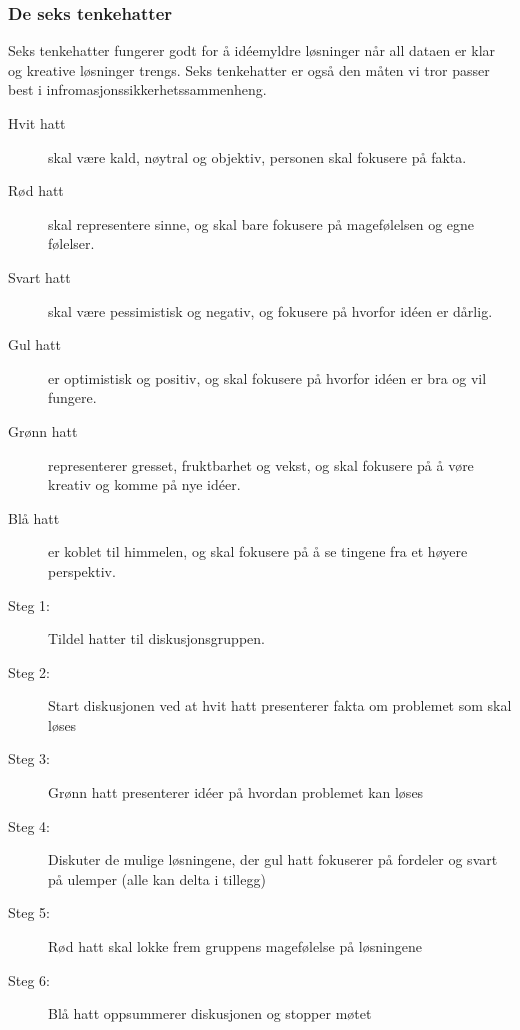 \subsubsection{De seks tenkehatter} 
Seks tenkehatter fungerer godt for å idéemyldre løsninger når all dataen er klar og kreative løsninger trengs. Seks tenkehatter er også den måten vi tror passer best i infromasjonssikkerhetssammenheng.
\begin{description}
    \item[Hvit hatt] skal være kald, nøytral og objektiv, personen skal fokusere på fakta.
    \item[Rød hatt] skal representere sinne, og skal bare fokusere på magefølelsen og egne følelser.
    \item[Svart hatt] skal være pessimistisk og negativ, og fokusere på hvorfor idéen er dårlig.
    \item[Gul hatt] er optimistisk og positiv, og skal fokusere på hvorfor idéen er bra og vil fungere.
    \item[Grønn hatt] representerer gresset, fruktbarhet og vekst, og skal fokusere på å vøre kreativ og komme på nye idéer.
    \item[Blå hatt] er koblet til himmelen, og skal fokusere på å se tingene fra et høyere perspektiv.
\end{description}

\begin{description}
    \item[Steg 1:] Tildel hatter til diskusjonsgruppen. 
    \item[Steg 2:] Start diskusjonen ved at hvit hatt presenterer fakta om problemet som skal løses
    \item[Steg 3:] Grønn hatt presenterer idéer på hvordan problemet kan løses
    \item[Steg 4:] Diskuter de mulige løsningene, der gul hatt fokuserer på fordeler og svart på ulemper (alle kan delta i tillegg)
    \item[Steg 5:] Rød hatt skal lokke frem gruppens magefølelse på løsningene
    \item[Steg 6:] Blå hatt oppsummerer diskusjonen og stopper møtet
\end{description}
    
